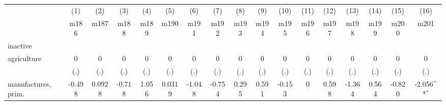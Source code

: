 {
\def\sym#1{\ifmmode^{#1}\else\(^{#1}\)\fi}
\begin{tabular}{l*{16}{c}}
\hline\hline
                    &\multicolumn{1}{c}{(1)}&\multicolumn{1}{c}{(2)}&\multicolumn{1}{c}{(3)}&\multicolumn{1}{c}{(4)}&\multicolumn{1}{c}{(5)}&\multicolumn{1}{c}{(6)}&\multicolumn{1}{c}{(7)}&\multicolumn{1}{c}{(8)}&\multicolumn{1}{c}{(9)}&\multicolumn{1}{c}{(10)}&\multicolumn{1}{c}{(11)}&\multicolumn{1}{c}{(12)}&\multicolumn{1}{c}{(13)}&\multicolumn{1}{c}{(14)}&\multicolumn{1}{c}{(15)}&\multicolumn{1}{c}{(16)}\\
                    &\multicolumn{1}{c}{m186}&\multicolumn{1}{c}{m187}&\multicolumn{1}{c}{m188}&\multicolumn{1}{c}{m189}&\multicolumn{1}{c}{m190}&\multicolumn{1}{c}{m191}&\multicolumn{1}{c}{m192}&\multicolumn{1}{c}{m193}&\multicolumn{1}{c}{m194}&\multicolumn{1}{c}{m195}&\multicolumn{1}{c}{m196}&\multicolumn{1}{c}{m197}&\multicolumn{1}{c}{m198}&\multicolumn{1}{c}{m199}&\multicolumn{1}{c}{m200}&\multicolumn{1}{c}{m201}\\
\hline
inactive            &                     &                     &                     &                     &                     &                     &                     &                     &                     &                     &                     &                     &                     &                     &                     &                     \\
agriculture         &           0         &           0         &           0         &           0         &           0         &           0         &           0         &           0         &           0         &           0         &           0         &           0         &           0         &           0         &           0         &           0         \\
                    &         (.)         &         (.)         &         (.)         &         (.)         &         (.)         &         (.)         &         (.)         &         (.)         &         (.)         &         (.)         &         (.)         &         (.)         &         (.)         &         (.)         &         (.)         &         (.)         \\
[1em]
manufactures, prim. &      -0.498         &      0.0928         &      -0.718         &       1.056         &      0.0319         &      -1.048         &      -0.754         &       0.295         &       0.591         &      -0.153         &           0         &       0.598         &      -1.364         &       0.564         &      -0.820         &      -2.056\sym{*}  \\

\end{tabular}}
